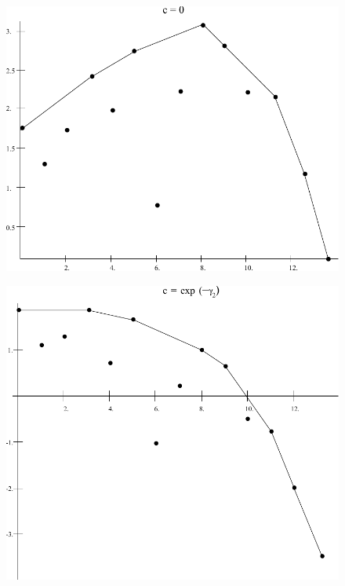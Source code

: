 \begin{figure}
\includegraphics[width=\textwidth]{fig_1.pdf}
\caption{}
\label{fig:1}
\end{figure}

\begin{figure}
\includegraphics[width=\textwidth]{fig_2.pdf}
\caption{}
\label{fig:2}
\end{figure}

